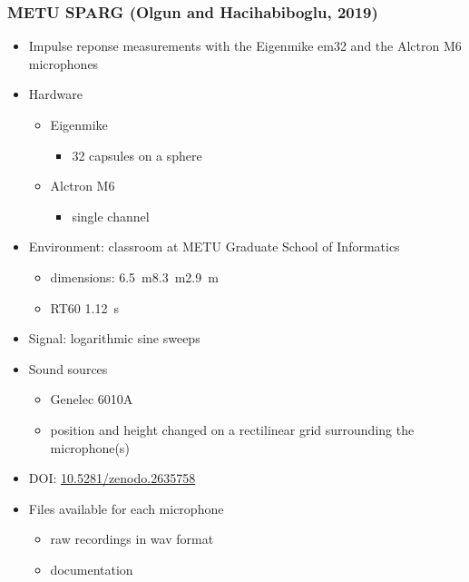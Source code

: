 \documentclass[14pt, legalpaper]{extarticle}
\begin{document}
\subsubsection{METU SPARG (Olgun and Hacihabiboglu, 2019)}

\begin{itemize}

\item Impulse reponse measurements with the Eigenmike em32 and the Alctron M6 microphones \cite{olgun2019metu}

\item Hardware
	\begin{itemize}
	\item Eigenmike
		\begin{itemize}
		\item 32 capsules on a sphere
		\end{itemize}
	\item Alctron M6
		\begin{itemize}
		\item single channel	
		\end{itemize}
	\end{itemize}

\item Environment: classroom at METU Graduate School of Informatics
	\begin{itemize}
	\item dimensions: \SI{6.5}{\metre}\texttimes\SI{8.3}{\metre}\texttimes\SI{2.9}{\metre}
	\item RT60 \SI{1.12}{\second} 
	\end{itemize}

\item Signal: logarithmic sine sweeps

\item Sound sources
	\begin{itemize}
	\item Genelec 6010A
	\item position and height changed on a rectilinear grid surrounding the microphone(s)
	\end{itemize}

\item DOI: \href{https://zenodo.org/record/2635758}{10.5281/zenodo.2635758} 

\item Files available for each microphone
	\begin{itemize}
	\item raw recordings in wav format
	\item documentation
	\end{itemize}

\end{itemize}
\end{document}
